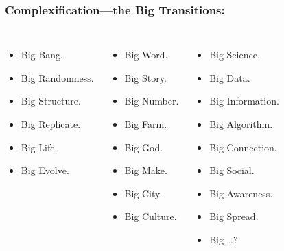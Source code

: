 \begin{frame}
  \frametitle{Complexification---the Big Transitions:}

  \begin{block}{}
  \begin{columns}
    \begin{itemize}
    \item<+->
      Big Bang.
    \item<+-> 
      Big Randomness.
    \item<+-> 
      Big Structure.
    \item<+-> 
      Big Replicate.
    \item<+-> 
      Big Life.
    \item<+-> 
      Big Evolve.
    \end{itemize}
    \begin{itemize}
    \item<+-> 
      Big Word.
    \item<+-> 
      Big Story.
    \item<+-> 
      Big Number.
    \item<+-> 
      Big Farm.
    \item<+-> 
      Big God.
    \item<+-> 
      Big Make.
    \item<+-> 
      Big City.
    \item<+-> 
      Big Culture.
    \end{itemize}
    \begin{itemize}
    \item<+->
      Big Science.
    \item<+-> 
      Big Data.
    \item<+-> 
      Big Information.
    \item<+-> 
      Big Algorithm.
    \item<+-> 
      Big Connection.
    \item<+-> 
      Big Social.
    \item<+-> 
      Big Awareness.
    \item<+-> 
      Big Spread.
    \item<+->
      Big \ldots ?
    \end{itemize}
  \end{columns}
  \end{block}

\end{frame}


